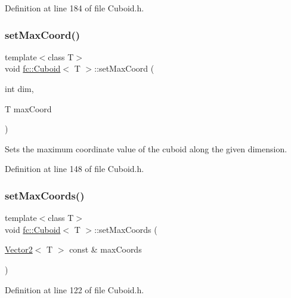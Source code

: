 Definition at line 184 of file Cuboid.\+h.

\mbox{\label{classfc_1_1Cuboid_ac30f778d3be6b1a4b174982ea729bddf}} 
\subsubsection{\texorpdfstring{set\+Max\+Coord()}{setMaxCoord()}}
{\footnotesize\ttfamily template$<$class T$>$ \\
void \hyperlink{classfc_1_1Cuboid}{fc\+::\+Cuboid}$<$ T $>$\+::set\+Max\+Coord (\begin{DoxyParamCaption}\item[{int}]{dim,  }\item[{T}]{max\+Coord }\end{DoxyParamCaption})}

Sets the maximum coordinate value of the cuboid along the given dimension. 

Definition at line 148 of file Cuboid.\+h.

\mbox{\label{classfc_1_1Cuboid_a61443edb86d089f4f89e91efbbd74287}} 
\subsubsection{\texorpdfstring{set\+Max\+Coords()}{setMaxCoords()}}
{\footnotesize\ttfamily template$<$class T$>$ \\
void \hyperlink{classfc_1_1Cuboid}{fc\+::\+Cuboid}$<$ T $>$\+::set\+Max\+Coords (\begin{DoxyParamCaption}\item[{\hyperlink{classfc_1_1Vector2}{Vector2}$<$ T $>$ const \&}]{max\+Coords }\end{DoxyParamCaption})}



Definition at line 122 of file Cuboid.\+h.

\mbox{\label{classfc_1_1Cuboid_a13c45ce619dbd1e925699f17e582fb2a}} 

